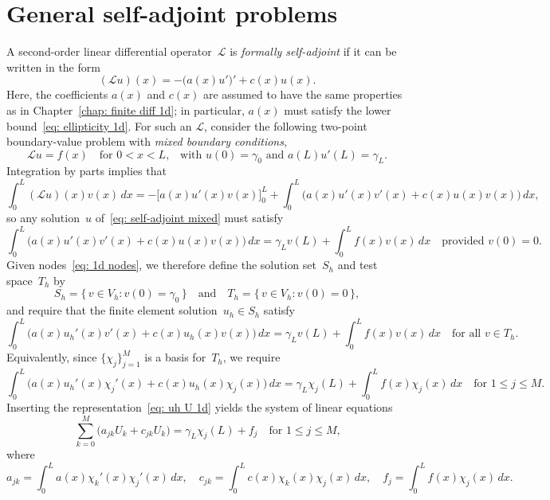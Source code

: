 \section{General self-adjoint problems}
A second-order linear differential operator~$\mathcal{L}$ is 
\emph{formally self-adjoint} if it can be written in the form
\begin{equation}\label{eq: L self-adjoint}
(\mathcal{L}u)(x)=-\bigl(a(x)u'\bigr)'+c(x)u(x).
\end{equation}
Here, the coefficients $a(x)$ and $c(x)$ are assumed to have the same 
properties as in Chapter~\ref{chap: finite diff 1d}; in particular, $a(x)$ must 
satisfy the lower bound~\eqref{eq: ellipticity 1d}. For such an $\mathcal{L}$, 
consider the following two-point boundary-value problem with \emph{mixed 
boundary conditions},
\begin{equation}\label{eq: self-adjoint mixed}
\mathcal{L}u=f(x)\quad\text{for $0<x<L$,}\quad
\text{with $u(0)=\gamma_0$ and $a(L)u'(L)=\gamma_L$.}
\end{equation}
Integration by parts implies that
\begin{equation}\label{eq: Lu v by parts}
\int_0^L(\mathcal{L}u)(x)v(x)\,dx
    =-\bigl[a(x)u'(x)v(x)\bigr]_0^L+\int_0^L\bigl(a(x)u'(x)v'(x)+c(x)u(x)v(x)
        \bigr)\,dx,
\end{equation}
so any solution~$u$ of~\eqref{eq: self-adjoint mixed} must satisfy
\[
\int_0^L\bigl(a(x)u'(x)v'(x)+c(x)u(x)v(x)\bigr)\,dx
    =\gamma_Lv(L)+\int_0^Lf(x)v(x)\,dx
    \quad\text{provided $v(0)=0$.}
\]
Given nodes~\eqref{eq: 1d nodes}, we therefore define the solution set~$S_h$ and 
test space~$T_h$ by
\[
S_h=\{\,v\in V_h:v(0)=\gamma_0\,\}
\quad\text{and}\quad
T_h=\{\,v\in V_h:v(0)=0\,\},
\]
and require that the finite element solution~$u_h\in S_h$ satisfy
\begin{equation}\label{eq: self-adjoint mixed bc FEM}
\int_0^L\bigl(a(x)u_h'(x)v'(x)+c(x)u_h(x)v(x)\bigr)\,dx
    =\gamma_Lv(L)+\int_0^Lf(x)v(x)\,dx
    \quad\text{for all $v\in T_h$.}
\end{equation}
Equivalently, since $\{\chi_j\}_{j=1}^M$ is a basis for~$T_h$, we require
\[
\int_0^L\bigl(a(x)u_h'(x)\chi_j'(x)+c(x)u_h(x)\chi_j(x)\bigr)\,dx
    =\gamma_L\chi_j(L)+\int_0^Lf(x)\chi_j(x)\,dx
    \quad\text{for $1\le j\le M$.}
\]
Inserting the representation~\eqref{eq: uh U 1d} yields the system of linear 
equations
\[
\sum_{k=0}^M\bigl(a_{jk}U_k+c_{jk}U_k\bigr)=\gamma_L\chi_j(L)+f_j
    \quad\text{for $1\le j\le M$,}
\]
where
\[
a_{jk}=\int_0^La(x)\chi_k'(x)\chi_j'(x)\,dx,\quad
c_{jk}=\int_0^Lc(x)\chi_k(x)\chi_j(x)\,dx,\quad
f_j=\int_0^Lf(x)\chi_j(x)\,dx.
\]
